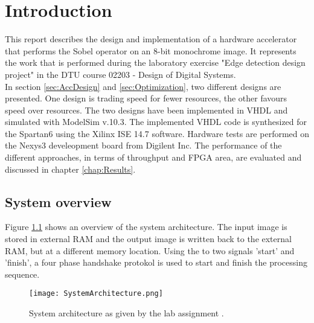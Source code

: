 \chapter{Introduction}
\label{chap:Intro}
This report describes the design and implementation of a hardware accelerator that performs the Sobel operator on an 8-bit monochrome image. It represents the work that is performed during the laboratory exercise "Edge detection design project" \cite{Sparsoe2014} in the DTU course 02203 - Design of Digital Systems.\\
In section \ref{sec:AccDesign} and \ref{sec:Optimization}, two different designs are presented. One design is trading speed for fewer resources, the other favours speed over resources. The two designs have been implemented in VHDL and simulated with ModelSim v.10.3. The implemented VHDL code is synthesized for the Spartan6 using the Xilinx ISE 14.7 software. Hardware tests are performed on the Nexys3 develeopment board from Digilent Inc. The performance of the different approaches, in terms of throughput and FPGA area, are evaluated and discussed in chapter \ref{chap:Results}.

\section{System overview}
\label{sec:SysOverview}
Figure \ref{fig:SysArch} shows an overview of the system architecture. The input image is stored in external RAM and the output image is written back to the external RAM, but at a different memory location. Using the to two signals 'start' and 'finish', a four phase handshake protokol is used to start and finish the processing sequence.

\begin{figure}[H]
	\centering
	\texttt{[image: SystemArchitecture.png]}
	\caption{System architecture as given by the lab assignment \cite{Sparsoe2014}.}
	\label{fig:SysArch}
\end{figure}
